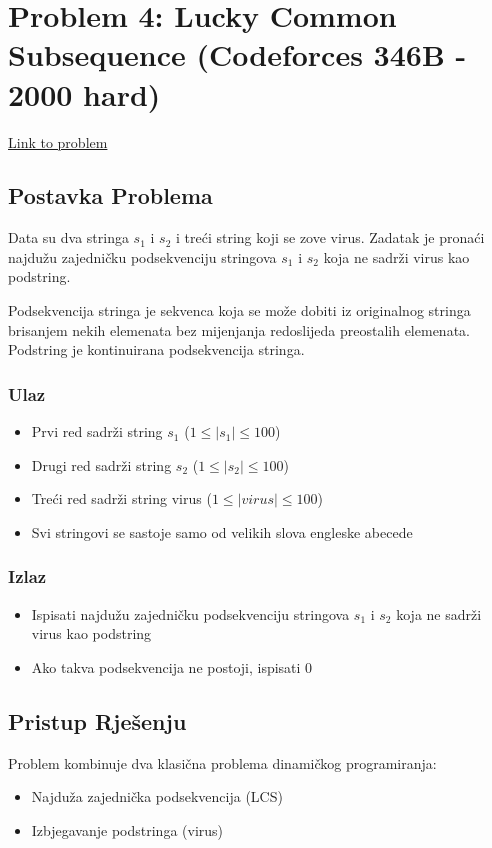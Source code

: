 \section{Problem 4: Lucky Common Subsequence (Codeforces 346B - 2000 hard)}
\href{https://codeforces.com/problemset/problem/346/B}{Link to problem}

\subsection{Postavka Problema}
Data su dva stringa $s_1$ i $s_2$ i treći string koji se zove virus. Zadatak je pronaći najdužu zajedničku podsekvenciju stringova $s_1$ i $s_2$ koja ne sadrži virus kao podstring.

Podsekvencija stringa je sekvenca koja se može dobiti iz originalnog stringa brisanjem nekih elemenata bez mijenjanja redoslijeda preostalih elemenata. Podstring je kontinuirana podsekvencija stringa.

\subsubsection{Ulaz}
\begin{itemize}
    \item Prvi red sadrži string $s_1$ ($1 \leq |s_1| \leq 100$)
    \item Drugi red sadrži string $s_2$ ($1 \leq |s_2| \leq 100$)
    \item Treći red sadrži string virus ($1 \leq |virus| \leq 100$)
    \item Svi stringovi se sastoje samo od velikih slova engleske abecede
\end{itemize}

\subsubsection{Izlaz}
\begin{itemize}
    \item Ispisati najdužu zajedničku podsekvenciju stringova $s_1$ i $s_2$ koja ne sadrži virus kao podstring
    \item Ako takva podsekvencija ne postoji, ispisati 0
\end{itemize}

\subsection{Pristup Rješenju}
Problem kombinuje dva klasična problema dinamičkog programiranja:
\begin{itemize}
    \item Najduža zajednička podsekvencija (LCS)
    \item Izbjegavanje podstringa (virus)
\end{itemize}

